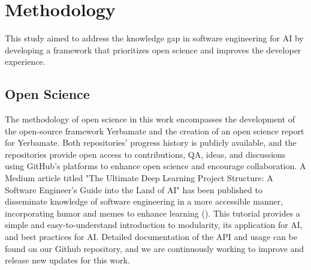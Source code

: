 


\section{Methodology}




This study aimed to address the knowledge gap in software engineering for AI by developing a framework that prioritizes open science and improves the developer experience. 

\subsection{Open Science}

The methodology of open science in this work encompasses the development of the open-source framework Yerbamate and the creation of an open science report for Yerbamate. Both repositories' progress history is publicly available, and the repositories provide open access to contributions, QA, ideas, and discussions using GitHub's platforms to enhance open science and encourage collaboration. A Medium article titled "The Ultimate Deep Learning Project Structure: A Software Engineer’s Guide into the Land of AI" has been published to disseminate knowledge of software engineering in a more accessible manner, incorporating humor and memes to enhance learning (\cite{powell1985humour}). This tutorial provides a simple and easy-to-understand introduction to modularity, its application for AI, and best practices for AI. Detailed documentation of the API and usage can be found on our Github repository, and we are continuously working to improve and release new updates for this work.


